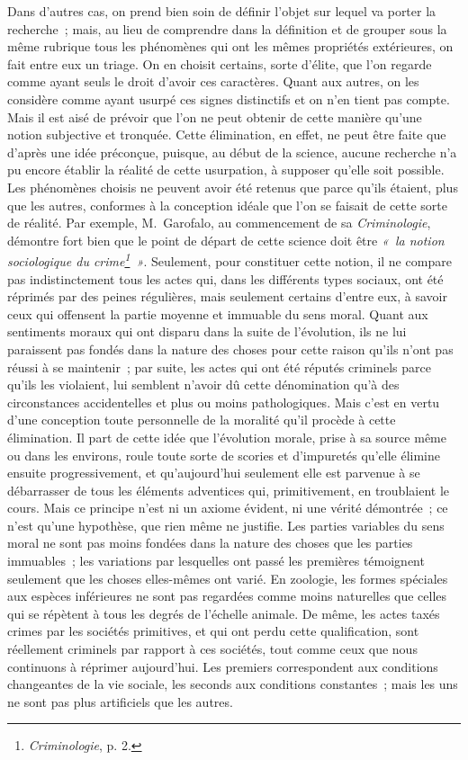 \documentclass[french,twoside]{book} %
\begin{document}
Dans d’autres cas, on prend bien soin de définir l’objet sur lequel va porter la recherche ; mais, au lieu de comprendre dans la définition et de grouper sous la même rubrique tous les phénomènes qui ont les mêmes propriétés extérieures, on fait entre eux un triage. On en choisit certains, sorte d’élite, que l’on regarde comme ayant seuls le droit d’avoir ces caractères. Quant aux autres, on les considère comme ayant usurpé ces signes distinctifs et on n’en tient pas compte. Mais il est aisé de prévoir que l’on ne peut obtenir de cette manière qu’une notion subjective et tronquée. Cette élimination, en effet, ne peut être faite que d’après une idée préconçue, puisque, au début de la science, aucune recherche n’a pu encore établir la réalité de cette usurpation, à supposer qu’elle soit possible. Les phénomènes choisis ne peuvent avoir été retenus que parce qu’ils étaient, plus que les autres, conformes à la conception idéale que l’on se faisait de cette sorte de réalité. Par exemple, M. Garofalo, au commencement de sa \emph{Criminologie}, démontre fort bien que le point de départ de cette science doit être \emph{« la notion sociologique du crime\footnote{\emph{Criminologie}, p. 2.} »}. Seulement, pour constituer cette notion, il ne compare pas indistinctement tous les actes qui, dans les différents types sociaux, ont été réprimés par des peines régulières, mais seulement certains d’entre eux, à savoir ceux qui offensent la partie moyenne et immuable du sens moral. Quant aux sentiments moraux qui ont disparu dans la suite de l’évolution, ils ne lui paraissent pas fondés dans la nature des choses pour cette raison qu’ils n’ont pas réussi à se maintenir ; par suite, les actes qui ont été réputés criminels parce qu’ils les violaient, lui semblent n’avoir dû cette dénomination qu’à des circonstances accidentelles et plus ou moins pathologiques. Mais c’est en vertu d’une conception toute personnelle de la moralité qu’il procède à cette élimination. Il part de cette idée que l’évolution morale, prise à sa source même ou dans les environs, roule toute sorte de scories et d’impuretés qu’elle élimine ensuite progressivement, et qu’aujourd’hui seulement elle est parvenue à se débarrasser de tous les éléments adventices qui, primitivement, en troublaient le cours. Mais ce principe n’est ni un axiome évident, ni une vérité démontrée ; ce n’est qu’une hypothèse, que rien même ne justifie. Les parties variables du sens moral ne sont pas moins fondées dans la nature des choses que les parties immuables ; les variations par lesquelles ont passé les premières témoignent seulement que les choses elles-mêmes ont varié. En zoologie, les formes spéciales aux espèces inférieures ne sont pas regardées comme moins naturelles que celles qui se répètent à tous les degrés de l’échelle animale. De même, les actes taxés crimes par les sociétés primitives, et qui ont perdu cette qualification, sont réellement criminels par rapport à ces sociétés, tout comme ceux que nous continuons à réprimer aujourd’hui. Les premiers correspondent aux conditions changeantes de la vie sociale, les seconds aux conditions constantes ; mais les uns ne sont pas plus artificiels que les autres.\par
\end{document}
